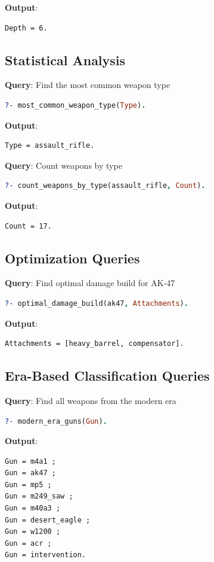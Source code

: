 \documentclass[12pt,a4paper]{article}
\begin{document}
\textbf{Output}:
\begin{lstlisting}
Depth = 6.
\end{lstlisting}

\subsection{Statistical Analysis}

\textbf{Query}: Find the most common weapon type
\begin{lstlisting}[language=Prolog]
?- most_common_weapon_type(Type).
\end{lstlisting}

\textbf{Output}:
\begin{lstlisting}
Type = assault_rifle.
\end{lstlisting}

\textbf{Query}: Count weapons by type
\begin{lstlisting}[language=Prolog]
?- count_weapons_by_type(assault_rifle, Count).
\end{lstlisting}

\textbf{Output}:
\begin{lstlisting}
Count = 17.
\end{lstlisting}

\subsection{Optimization Queries}

\textbf{Query}: Find optimal damage build for AK-47
\begin{lstlisting}[language=Prolog]
?- optimal_damage_build(ak47, Attachments).
\end{lstlisting}

\textbf{Output}:
\begin{lstlisting}
Attachments = [heavy_barrel, compensator].
\end{lstlisting}

\subsection{Era-Based Classification Queries}

\textbf{Query}: Find all weapons from the modern era
\begin{lstlisting}[language=Prolog]
?- modern_era_guns(Gun).
\end{lstlisting}

\textbf{Output}:
\begin{lstlisting}
Gun = m4a1 ;
Gun = ak47 ;
Gun = mp5 ;
Gun = m249_saw ;
Gun = m40a3 ;
Gun = desert_eagle ;
Gun = w1200 ;
Gun = acr ;
Gun = intervention.
\end{lstlisting}
\end{document}
